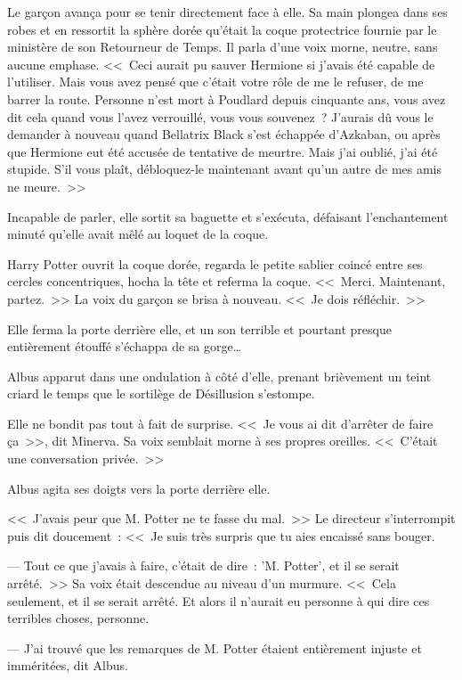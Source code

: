 Le garçon avança pour se tenir directement face à elle. Sa main plongea dans ses robes et en ressortit la sphère dorée qu'était la coque protectrice fournie par le ministère de son Retourneur de Temps. Il parla d'une voix morne, neutre, sans aucune emphase. <<~Ceci aurait pu sauver Hermione si j'avais été capable de l'utiliser. Mais vous avez pensé que c'était votre rôle de me le refuser, de me barrer la route. Personne n'est mort à Poudlard depuis cinquante ans, vous avez dit cela quand vous l'avez verrouillé, vous vous souvenez~? J'aurais dû vous le demander à nouveau quand Bellatrix Black s'est échappée d'Azkaban, ou après que Hermione eut été accusée de tentative de meurtre. Mais j'ai oublié, j'ai été stupide. S'il vous plaît, débloquez-le maintenant avant qu'un autre de mes amis ne meure.~>>

Incapable de parler, elle sortit sa baguette et s'exécuta, défaisant l'enchantement minuté qu'elle avait mêlé au loquet de la coque.

Harry Potter ouvrit la coque dorée, regarda le petite sablier coincé entre ses cercles concentriques, hocha la tête et referma la coque. <<~Merci. Maintenant, partez.~>> La voix du garçon se brisa à nouveau. <<~Je dois réfléchir.~>>

\later

Elle ferma la porte derrière elle, et un son terrible et pourtant presque entièrement étouffé s'échappa de sa gorge…

Albus apparut dans une ondulation à côté d'elle, prenant brièvement un teint criard le temps que le sortilège de Désillusion s'estompe.

Elle ne bondit pas tout à fait de surprise. <<~Je vous ai dit d'arrêter de faire ça~>>, dit Minerva. Sa voix semblait morne à ses propres oreilles. <<~C'était une conversation privée.~>>

Albus agita ses doigts vers la porte derrière elle.

<<~J'avais peur que M. Potter ne te fasse du mal.~>> Le directeur s'interrompit puis dit doucement~: <<~Je suis très surpris que tu aies encaissé sans bouger.

--- Tout ce que j'avais à faire, c'était de dire~: 'M. Potter', et il se serait arrêté.~>> Sa voix était descendue au niveau d'un murmure. <<~Cela seulement, et il se serait arrêté. Et alors il n'aurait eu personne à qui dire ces terribles choses, personne.

--- J'ai trouvé que les remarques de M. Potter étaient entièrement injuste et imméritées, dit Albus.

